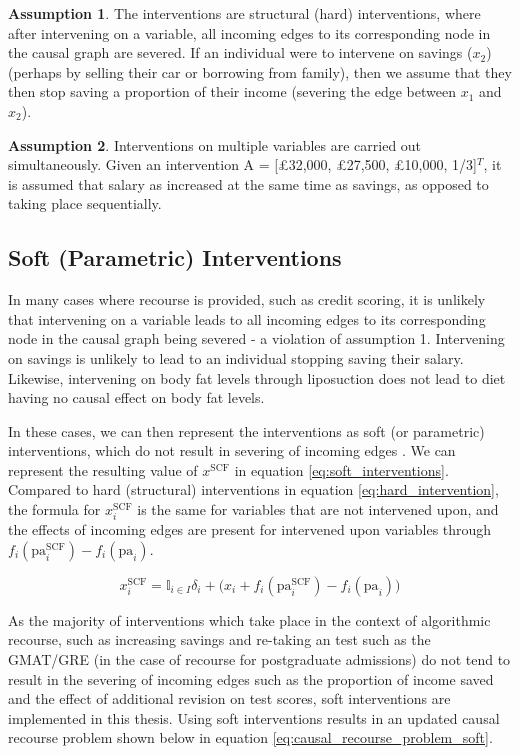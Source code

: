 \textbf{Assumption 1}. The interventions are structural (hard) interventions, where after intervening on a variable, all incoming edges to its corresponding node in the causal graph are severed. If an individual were to intervene on savings ($x_2$) (perhaps by selling their car or borrowing from family), then we assume that they then stop saving a proportion of their income (severing the edge between $x_1$ and $x_2$).

\textbf{Assumption 2}. Interventions on multiple variables are carried out simultaneously. Given an intervention A = [£32,000, £27,500, £10,000, 1/3]$^T$, it is assumed that salary as increased at the same time as savings, as opposed to taking place sequentially.

\subsection{Soft (Parametric) Interventions}

In many cases where recourse is provided, such as credit scoring, it is unlikely that intervening on a variable leads to all incoming edges to its corresponding node in the causal graph being severed - a violation of assumption 1. Intervening on savings is unlikely to lead to an individual stopping saving their salary. Likewise, intervening on body fat levels through liposuction does not lead to diet having no causal effect on body fat levels. 

In these cases, we can then represent the interventions as soft (or parametric) interventions, which do not result in severing of incoming edges \citep{eberhardtInterventionsCausalInference2007}. We can represent the resulting value of $x^{\text{SCF}}$ in equation \ref{eq:soft_interventions}. Compared to hard (structural) interventions in equation \ref{eq:hard_intervention}, the formula for $x_i^{\text{SCF}}$ is the same for variables that are not intervened upon, and the effects of incoming edges are present for intervened upon variables through $f_i(\text{pa}^{\text{SCF}}_i) - f_i(\text{pa}_i)$.

\begin{equation} \label{eq:soft_interventions}
	x^{\text{SCF}}_i = \mathbb{I}_{i \in I} \delta_i + \bigg( x_i + f_i(\text{pa}^{\text{SCF}}_i) - f_i(\text{pa}_i) \bigg)
\end{equation}

As the majority of interventions which take place in the context of algorithmic recourse, such as increasing savings and re-taking an test such as the GMAT/GRE (in the case of recourse for postgraduate admissions) do not tend to result in the severing of incoming edges such as the proportion of income saved and the effect of additional revision on test scores, soft interventions are implemented in this thesis. Using soft interventions results in an updated causal recourse problem shown below in equation \ref{eq:causal_recourse_problem_soft}.

